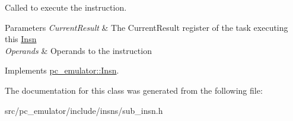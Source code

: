 Called to execute the instruction. 


\begin{DoxyParams}{Parameters}
{\em Current\+Result} & The Current\+Result register of the task executing this \hyperlink{classpc__emulator_1_1Insn}{Insn} \\
\hline
{\em Operands} & Operands to the instruction \\
\hline
\end{DoxyParams}


Implements \hyperlink{classpc__emulator_1_1Insn_a103d27030e872a799e313df16c1f3d66}{pc\+\_\+emulator\+::\+Insn}.



The documentation for this class was generated from the following file\+:\begin{DoxyCompactItemize}
\item 
src/pc\+\_\+emulator/include/insns/sub\+\_\+insn.\+h\end{DoxyCompactItemize}
